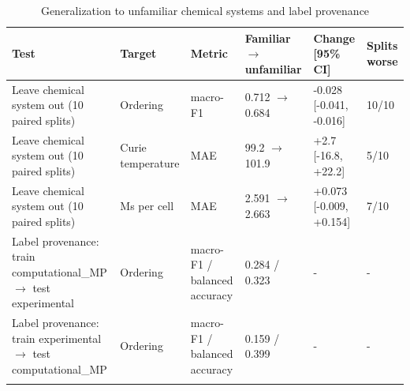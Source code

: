 \begin{table}[h]
\caption{Generalization to unfamiliar chemical systems and label provenance}
\label{tab:table6_generalization_internal}
\begin{tabular*}{\textwidth}{@{\extracolsep\fill}llllll}
\toprule
Test & Target & Metric & Familiar $\rightarrow$ unfamiliar & Change [95\% CI] & Splits worse \\
\midrule
Leave chemical system out (10 paired splits) & Ordering & macro-F1 & 0.712 $\rightarrow$ 0.684 & -0.028 [-0.041, -0.016] & 10/10 \\
Leave chemical system out (10 paired splits) & Curie temperature & MAE & 99.2 $\rightarrow$ 101.9 & +2.7 [-16.8, +22.2] & 5/10 \\
Leave chemical system out (10 paired splits) & Ms per cell & MAE & 2.591 $\rightarrow$ 2.663 & +0.073 [-0.009, +0.154] & 7/10 \\
Label provenance: train computational\_MP $\rightarrow$ test experimental & Ordering & macro-F1 / balanced accuracy & 0.284 / 0.323 & - & - \\
Label provenance: train experimental $\rightarrow$ test computational\_MP & Ordering & macro-F1 / balanced accuracy & 0.159 / 0.399 & - & - \\
\botrule
\end{tabular*}
\end{table}
